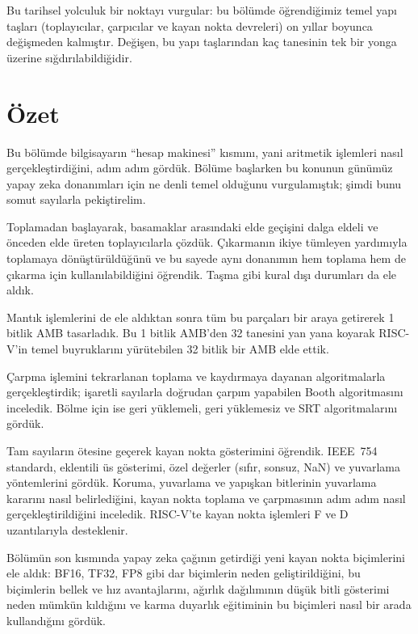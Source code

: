 Bu tarihsel yolculuk bir noktayı vurgular: bu bölümde öğrendiğimiz temel yapı taşları (toplayıcılar, çarpıcılar ve kayan nokta devreleri) on yıllar boyunca değişmeden kalmıştır. Değişen, bu yapı taşlarından kaç tanesinin tek bir yonga üzerine sığdırılabildiğidir.

\section{Özet}

Bu bölümde bilgisayarın ``hesap makinesi'' kısmını, yani aritmetik işlemleri nasıl gerçekleştirdiğini, adım adım gördük. Bölüme başlarken bu konunun günümüz yapay zeka donanımları için ne denli temel olduğunu vurgulamıştık; şimdi bunu somut sayılarla pekiştirelim.

Toplamadan başlayarak, basamaklar arasındaki elde geçişini dalga eldeli ve önceden elde üreten toplayıcılarla çözdük. Çıkarmanın ikiye tümleyen yardımıyla toplamaya dönüştürüldüğünü ve bu sayede aynı donanımın hem toplama hem de çıkarma için kullanılabildiğini öğrendik. Taşma gibi kural dışı durumları da ele aldık.

Mantık işlemlerini de ele aldıktan sonra tüm bu parçaları bir araya getirerek 1 bitlik AMB tasarladık. Bu 1 bitlik AMB'den 32 tanesini yan yana koyarak RISC-V'in temel buyruklarını yürütebilen 32 bitlik bir AMB elde ettik.

Çarpma işlemini tekrarlanan toplama ve kaydırmaya dayanan algoritmalarla gerçekleştirdik; işaretli sayılarla doğrudan çarpım yapabilen Booth algoritmasını inceledik. Bölme için ise geri yüklemeli, geri yüklemesiz ve SRT algoritmalarını gördük.

Tam sayıların ötesine geçerek kayan nokta gösterimini öğrendik. IEEE~754 standardı, eklentili üs gösterimi, özel değerler (sıfır, sonsuz, NaN) ve yuvarlama yöntemlerini gördük. Koruma, yuvarlama ve yapışkan bitlerinin yuvarlama kararını nasıl belirlediğini, kayan nokta toplama ve çarpmasının adım adım nasıl gerçekleştirildiğini inceledik. RISC-V'te kayan nokta işlemleri F ve D uzantılarıyla desteklenir.

Bölümün son kısmında yapay zeka çağının getirdiği yeni kayan nokta biçimlerini ele aldık: BF16, TF32, FP8 gibi dar biçimlerin neden geliştirildiğini, bu biçimlerin bellek ve hız avantajlarını, ağırlık dağılımının düşük bitli gösterimi neden mümkün kıldığını ve karma duyarlık eğitiminin bu biçimleri nasıl bir arada kullandığını gördük.

